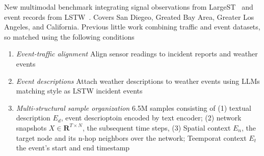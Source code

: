 \documentclass[11pt]{article}
\begin{document}
New multimodal benchmark integrating signal observations from LargeST~\cite{liu2023largest} and event records from LSTW~\cite{moosavi2019short}. Covers San Diegeo, Greated Bay Area, Greater Los Angeles, and California. Previous little work combining traffic and event datasets, so matched using the following conditions
\begin{enumerate}
  \item \textit{Event-traffic alignment} Align sensor readings to incident reports and weather events
  \item \textit{Event descriptions} Attach weather descriptions to weather events using LLMs matching style as LSTW incident events
  \item \textit{Multi-structural sample organization} 6.5M samples consisting of (1) textual description $E_d$, event descrioptoin encoded by text encoder; (2) network snapshots $X\in \mathbf{R}^{T\times N}$, the subsequent time steps, (3) Spatial context $E_n$, the target node and its n-hop neighbors over the network; Teemporat context $E_t$ the event's start and end timestamp
\end{enumerate}

\begin{table}[h]
\centering
\caption{Summary of Net-Ev2-6.5M benchmark (*no detailed incident types are reported for GLA and GBA in LSTW).}
\end{table}
\end{document}
